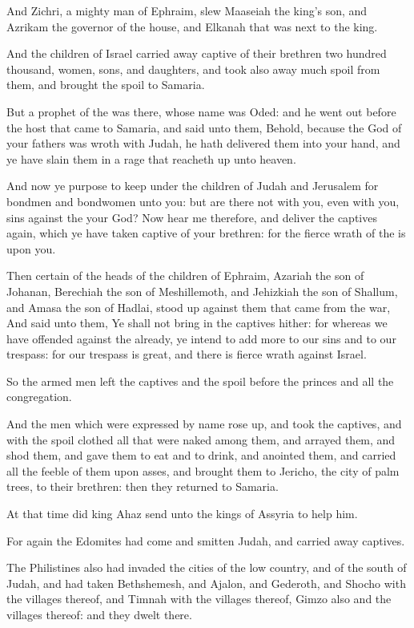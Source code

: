\verse And Zichri, a mighty man of Ephraim, slew Maaseiah the king's son, and Azrikam the governor of the house, and Elkanah that was next to the king.

\verse And the children of Israel carried away captive of their brethren two hundred thousand, women, sons, and daughters, and took also away much spoil from them, and brought the spoil to Samaria.

\verse But a prophet of the \LORD was there, whose name was Oded: and he went out before the host that came to Samaria, and said unto them, Behold, because the \LORD God of your fathers was wroth with Judah, he hath delivered them into your hand, and ye have slain them in a rage that reacheth up unto heaven.

\verse And now ye purpose to keep under the children of Judah and Jerusalem for bondmen and bondwomen unto you: but are there not with you, even with you, sins against the \LORD your God?  \verse Now hear me therefore, and deliver the captives again, which ye have taken captive of your brethren: for the fierce wrath of the \LORD is upon you.

\verse Then certain of the heads of the children of Ephraim, Azariah the son of Johanan, Berechiah the son of Meshillemoth, and Jehizkiah the son of Shallum, and Amasa the son of Hadlai, stood up against them that came from the war, \verse And said unto them, Ye shall not bring in the captives hither: for whereas we have offended against the \LORD already, ye intend to add more to our sins and to our trespass: for our trespass is great, and there is fierce wrath against Israel.

\verse So the armed men left the captives and the spoil before the princes and all the congregation.

\verse And the men which were expressed by name rose up, and took the captives, and with the spoil clothed all that were naked among them, and arrayed them, and shod them, and gave them to eat and to drink, and anointed them, and carried all the feeble of them upon asses, and brought them to Jericho, the city of palm trees, to their brethren: then they returned to Samaria.

\verse At that time did king Ahaz send unto the kings of Assyria to help him.

\verse For again the Edomites had come and smitten Judah, and carried away captives.

\verse The Philistines also had invaded the cities of the low country, and of the south of Judah, and had taken Bethshemesh, and Ajalon, and Gederoth, and Shocho with the villages thereof, and Timnah with the villages thereof, Gimzo also and the villages thereof: and they dwelt there.

